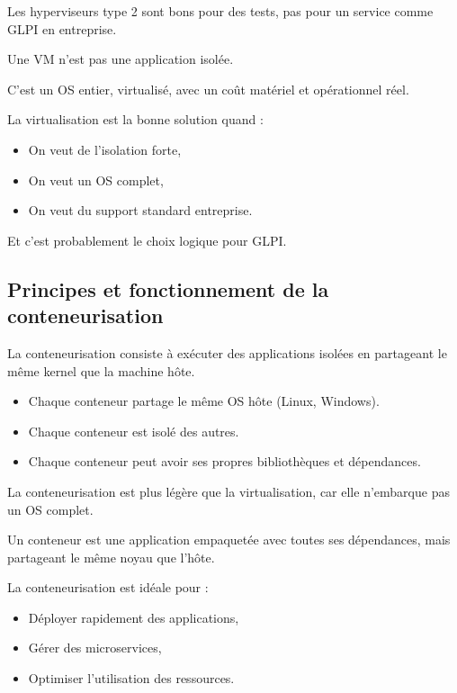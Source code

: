 \noindent Les hyperviseurs type 2 sont bons pour des tests, pas pour un service comme GLPI en entreprise.

\noindent Une VM n’est pas une application isolée.

\noindent C’est un OS entier, virtualisé, avec un coût matériel et opérationnel réel. \\

\newpage

\noindent La virtualisation est la bonne solution quand :
\begin{itemize}
  \item On veut de l’isolation forte,
  \item On veut un OS complet,
  \item On veut du support standard entreprise.
\end{itemize}

\noindent Et c’est probablement le choix logique pour GLPI.

\subsection*{Principes et fonctionnement de la conteneurisation}
{}
\noindent La conteneurisation consiste à exécuter des applications isolées en partageant le même kernel que la machine hôte.

\begin{itemize}
  \item Chaque conteneur partage le même OS hôte (Linux, Windows).
  \item Chaque conteneur est isolé des autres.
  \item Chaque conteneur peut avoir ses propres bibliothèques et dépendances.
\end{itemize}

\noindent La conteneurisation est plus légère que la virtualisation, car elle n’embarque pas un OS complet. 

\noindent Un conteneur est une application empaquetée avec toutes ses dépendances, mais partageant le même noyau que l’hôte. 

\noindent La conteneurisation est idéale pour :
\begin{itemize}
  \item Déployer rapidement des applications,
  \item Gérer des microservices,
  \item Optimiser l’utilisation des ressources.
\end{itemize}

